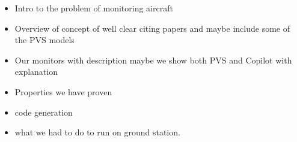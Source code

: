 \begin{itemize}
\item Intro to the problem of monitoring aircraft
\item Overview of concept of well clear citing papers and maybe include some of the PVS models
\item Our monitors with description maybe we show both PVS and Copilot with explanation
\item Properties we have proven
\item code generation 
\item what we had to do to run on ground station. 
\end{itemize}




